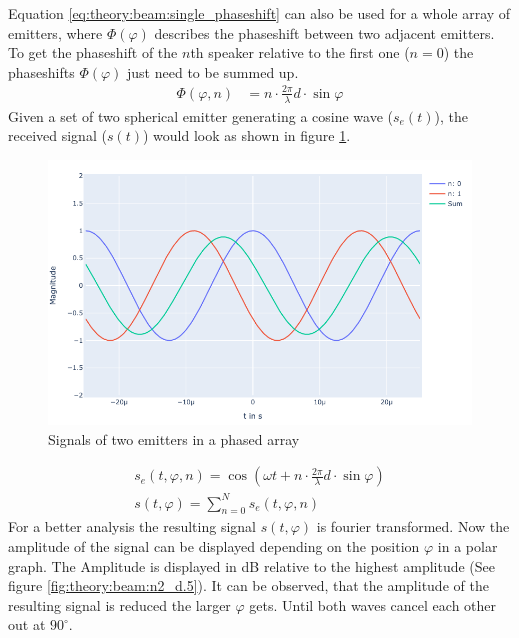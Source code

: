 %
Equation \ref{eq:theory:beam:single_phaseshift} can also be used for a whole array of emitters, where $\Phi(\varphi)$ describes the phaseshift between two adjacent emitters. To get the phaseshift of the $n$th speaker relative to the first one ($n=0$) the phaseshifts $\Phi(\varphi)$ just need to be summed up.
%
\begin{align}
  \Phi(\varphi, n) &= n \cdot \frac{2\pi}{\lambda} d \cdot \sin \varphi
\end{align}
%
Given a set of two spherical emitter generating a cosine wave (\(s_e(t)\)), the received signal (\(s(t)\)) would look as shown in figure \ref{fig:theory:beam:time}.
%
\begin{figure}
  \centering
  \includegraphics[height=\mediumheight]{src/assets/pictures/theory/beam_time_n2_45deg.png}
  \caption{Signals of two emitters in a phased array}
  \label{fig:theory:beam:time}
\end{figure}
%
\begin{align}
  s_e(t, \varphi, n) = \cos (\omega t + n \cdot \frac{2\pi}{\lambda} d \cdot \sin \varphi )\label{eq:theory:beam:sig}\\[1em]
  s(t, \varphi) = \sum_{n = 0}^{N} s_e(t, \varphi, n)
\end{align}
%
For a better analysis the resulting signal \(s(t, \varphi)\) is fourier transformed. Now the amplitude of the signal can be displayed depending on the position \(\varphi\) in a polar graph. The Amplitude is displayed in dB relative to the highest amplitude (See figure \ref{fig:theory:beam:n2_d.5}).\p
It can be observed, that the amplitude of the resulting signal is reduced the larger \(\varphi\) gets. Until both waves cancel each other out at \(90^\circ\).
%
